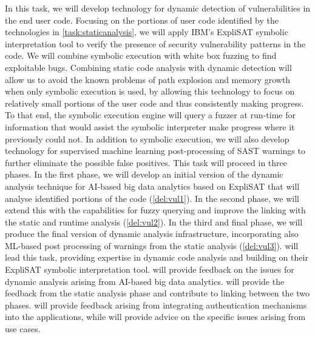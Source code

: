 \begin{Workpackage}{\thewpno}
\begin{Task}
\end{Task}

\begin{Task}
\TaskResults{%
\ref{del:vul1},
\ref{del:vul2},
\ref{del:vul3}
}
\TaskHeader{}
In this task, we will develop technology for dynamic detection of vulnerabilities in the end user code. Focusing on the portions of user code identified by the technologies in  \ref{task:staticanalysis}, we will apply IBM's ExpliSAT symbolic interpretation tool to verify the presence of security vulnerability patterns in the code. We will combine symbolic execution with white box fuzzing to find exploitable bugs. Combining static code analysis with dynamic detection will allow us to avoid the known problems of path explosion and memory growth when only symbolic execution is used, by allowing this technology to focus on relatively small portions of the user code and thus consistently making progress. To that end, the symbolic execution engine will query a fuzzer at run-time for information that would assist the symbolic interpreter make progress where it previously could not. In addition to symbolic execution, we will also develop technology for supervised machine learning post-processing of SAST warnings to further eliminate the possible false positives. This task will proceed in three phases. In the first phase, we will develop an initial version of the dynamic analysis technique for AI-based big data analytics based on ExpliSAT that will analyse identified portions of the code (\ref{del:vul1}). In the second phase, we will extend this with the capabilities for fuzzy querying and improve the linking with the static and runtime analysis (\ref{del:vul2}). In the third and final phase, we will produce the final version of dynamic analysis infrastructure, incorporating also ML-based post processing of warnings from the static analysis (\ref{del:vul3}). \IBMshort{} will lead this task, providing expertise in dynamic code analysis and building on their ExpliSAT symbolic interpretation tool. \UODshort{} will provide feedback on the issues for dynamic analysis arising from AI-based big data analytics. \YAGshort{} will provide the feedback from the static analysis phase and contribute to linking between the two phases. \COGNIshort{} will provide feedback arising from integrating authentication mechanisms into the applications, while \SOPRAshort{} will provide advice on the specific issues arising from use cases.
\end{Task}


\end{Workpackage}
